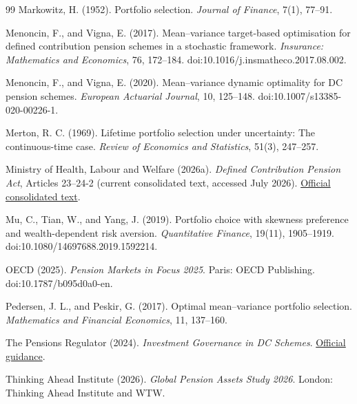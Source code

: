 \documentclass[10pt,a4paper]{article}
\theoremstyle{plain}
\theoremstyle{definition}
\begin{document}
\begin{thebibliography}{99}
Markowitz, H. (1952).
Portfolio selection.
\emph{Journal of Finance}, 7(1), 77--91.

Menoncin, F., and Vigna, E. (2017).
Mean--variance target-based optimisation for defined contribution pension schemes in a stochastic framework.
\emph{Insurance: Mathematics and Economics}, 76, 172--184.
doi:10.1016/j.insmatheco.2017.08.002.

Menoncin, F., and Vigna, E. (2020).
Mean--variance dynamic optimality for DC pension schemes.
\emph{European Actuarial Journal}, 10, 125--148.
doi:10.1007/s13385-020-00226-1.

Merton, R. C. (1969).
Lifetime portfolio selection under uncertainty: The continuous-time case.
\emph{Review of Economics and Statistics}, 51(3), 247--257.

Ministry of Health, Labour and Welfare (2026a).
\emph{Defined Contribution Pension Act}, Articles 23--24-2 (current consolidated text, accessed July 2026).
\href{https://www.mhlw.go.jp/web/t_doc?dataId=85aa2545&dataType=0&pageNo=1}{Official consolidated text}.

Mu, C., Tian, W., and Yang, J. (2019).
Portfolio choice with skewness preference and wealth-dependent risk aversion.
\emph{Quantitative Finance}, 19(11), 1905--1919.
doi:10.1080/14697688.2019.1592214.

OECD (2025).
\emph{Pension Markets in Focus 2025}.
Paris: OECD Publishing.
doi:10.1787/b095d0a0-en.

Pedersen, J. L., and Peskir, G. (2017).
Optimal mean--variance portfolio selection.
\emph{Mathematics and Financial Economics}, 11, 137--160.

The Pensions Regulator (2024).
\emph{Investment Governance in DC Schemes}.
\href{https://www.thepensionsregulator.gov.uk/document-library/scheme-management-detailed-guidance/funding-and-investment-detailed-guidance/investment-guide-for-dc-pension-schemes}{Official guidance}.

Thinking Ahead Institute (2026).
\emph{Global Pension Assets Study 2026}.
London: Thinking Ahead Institute and WTW.


\end{thebibliography}
\end{document}
